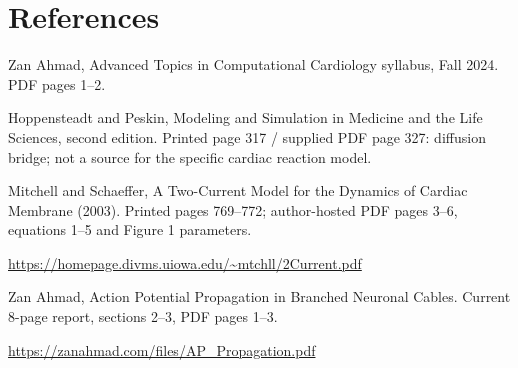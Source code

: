 \documentclass[11pt,letterpaper]{article}
\theoremstyle{definition}\newtheorem{definition}{Definition}\newtheorem{example}{Example}
\numberwithin{equation}{section}
\begin{document}
\section*{References}
\noindent\begin{minipage}{\linewidth}
Zan Ahmad, Advanced Topics in Computational Cardiology syllabus, Fall 2024. PDF pages 1--2.

\end{minipage}\par\medskip
\noindent\begin{minipage}{\linewidth}
Hoppensteadt and Peskin, Modeling and Simulation in Medicine and the Life Sciences, second edition. Printed page 317 / supplied PDF page 327: diffusion bridge; not a source for the specific cardiac reaction model.

\end{minipage}\par\medskip
\noindent\begin{minipage}{\linewidth}
Mitchell and Schaeffer, A Two-Current Model for the Dynamics of Cardiac Membrane (2003). Printed pages 769--772; author-hosted PDF pages 3--6, equations 1--5 and Figure 1 parameters.

\url{https://homepage.divms.uiowa.edu/~mtchll/2Current.pdf}
\end{minipage}\par\medskip
\noindent\begin{minipage}{\linewidth}
Zan Ahmad, Action Potential Propagation in Branched Neuronal Cables. Current 8-page report, sections 2--3, PDF pages 1--3.

\url{https://zanahmad.com/files/AP_Propagation.pdf}
\end{minipage}\par\medskip
\end{document}

